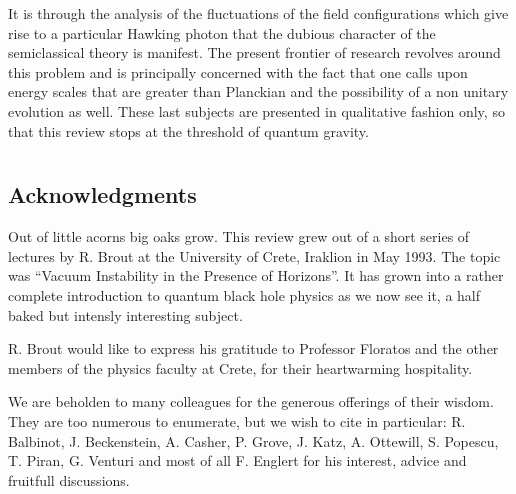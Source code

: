 \documentclass[12pt,oneside]{report}
\begin{document}
It is through the analysis of the fluctuations of the field
configurations which give rise to a particular Hawking photon that the
dubious character of the semiclassical theory is manifest. The present
frontier of research revolves around this problem and is principally
concerned with the fact that one calls upon energy scales that are greater
than Planckian and the possibility of a non unitary evolution as well. These
last subjects are presented in qualitative fashion only, so that this review
stops at the threshold of quantum gravity. \newpage

\tableofcontents

\chapter*{}
\section*{Acknowledgments}


Out of little acorns big oaks grow. This review grew out
of a short series of lectures by R. Brout at the
University of Crete, Iraklion in May 1993. The topic was
``Vacuum Instability in the Presence of Horizons''. It has
grown into a rather complete introduction to quantum black
hole physics as we now see it, a half baked but intensly
interesting subject.

R. Brout would like to express his gratitude to Professor
Floratos and the other members of the physics faculty at
Crete, for their heartwarming hospitality.

We are beholden to many colleagues for the generous
offerings of their wisdom. They are too numerous to
enumerate, but we wish to cite in particular: R. Balbinot,
J. Beckenstein, A. Casher, P. Grove, J. Katz, A. Ottewill,
S. Popescu, T. Piran, G. Venturi and most of all F.
Englert for his interest, advice and fruitfull discussions.


\strut \vfill \pagebreak

\end{document}
